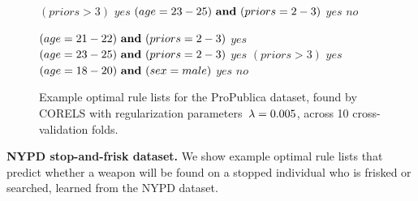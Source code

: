\begin{figure}[h!]
\begin{algorithmic}
\State \belif $(priors > 3)$ \bthen $yes$
\State \belif $(age = 23-25) {\bf ~and~} (priors = 2-3)$ \bthen $yes$
\State \belse $no$
\end{algorithmic}
\vspace{1mm}
\begin{algorithmic}
\State \bif $(age = 21-22) {\bf ~and~} (priors = 2-3)$ \bthen $yes$ 
\State \belif $(age = 23-25) {\bf ~and~} (priors = 2-3)$ \bthen $yes$
\State \belif $(priors > 3)$ \bthen $yes$
\State \belif $(age = 18-20) {\bf ~and~} (sex = male)$ \bthen $yes$
\State \belse $no$
\end{algorithmic}
\caption{Example optimal rule lists for the ProPublica dataset,
found by CORELS with regularization parameters~${{\lambda} = 0.005}$,
across 10 cross-validation folds.
}
\label{fig:recidivism-rule-list-005}
\end{figure}

\clearpage
\textbf{NYPD stop-and-frisk dataset.}
We show example optimal rule lists that predict whether a weapon
will be found on a stopped individual who is frisked or searched, learned from the NYPD dataset.

